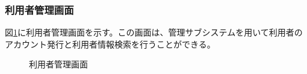 \documentclass[a4j]{jarticle}
\begin{document}


\subsubsection{利用者管理画面}
図\ref{fig:user_admin_top}に利用者管理画面を示す。この画面は、管理サブシステムを用いて利用者のアカウント発行と利用者情報検索を行うことができる。
\begin{figure}[H]
\centering
{}
\caption{利用者管理画面}
\label{fig:user_admin_top}
\end{figure}
\end{document}
